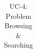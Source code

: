 \begin{table}[H]
\begin{tabular}{|p{4cm}|p{11cm}|}
\end{tabular}
\caption{UC-4: Problem Browsing \& Searching}
\end{table}
